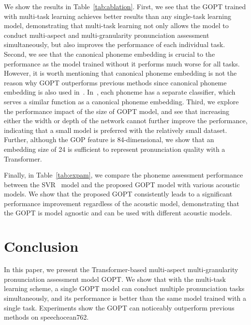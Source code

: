 \documentclass{article}
\begin{document}
We show the results in Table~\ref{tab:ablation}. First, we see that the GOPT trained with multi-task learning achieves better results than any single-task learning model, demonstrating that multi-task learning not only allows the model to conduct multi-aspect and multi-granularity pronunciation assessment simultaneously, but also improves the performance of each individual task. Second, we see that the canonical phoneme embedding is crucial to the performance as the model trained without it performs much worse for all tasks. However, it is worth mentioning that canonical phoneme embedding is not the reason why GOPT outperforms previous methods since canonical phoneme embedding is also used in~\cite{lin2021deep}. In~\cite{zhang2021speechocean762}, each phoneme has a separate classifier, which serves a similar function as a canonical phoneme embedding. Third, we explore the performance impact of the size of GOPT model, and see that increasing either the width or depth of the network cannot further improve the performance, indicating that a small model is preferred with the relatively small dataset. Further, although the GOP feature is 84-dimensional, we show that an embedding size of 24 is sufficient to represent pronunciation quality with a Transformer.

Finally, in Table~\ref{tab:expam}, we compare the phoneme assessment performance between the SVR~\cite{zhang2021speechocean762} model and the proposed GOPT model with various acoustic models. We show that the proposed GOPT consistently leads to a significant performance improvement regardless of the acoustic model, demonstrating that the GOPT is model agnostic and can be used with different acoustic models.

\section{Conclusion}

In this paper, we present the Transformer-based multi-aspect multi-granularity pronunciation assessment model GOPT. We show that with the multi-task learning scheme, a single GOPT model can conduct multiple pronunciation tasks simultaneously, and its performance is better than the same model trained with a single task. Experiments show the GOPT can noticeably outperform previous methods on speechocean762.



\newpage


\end{document}
